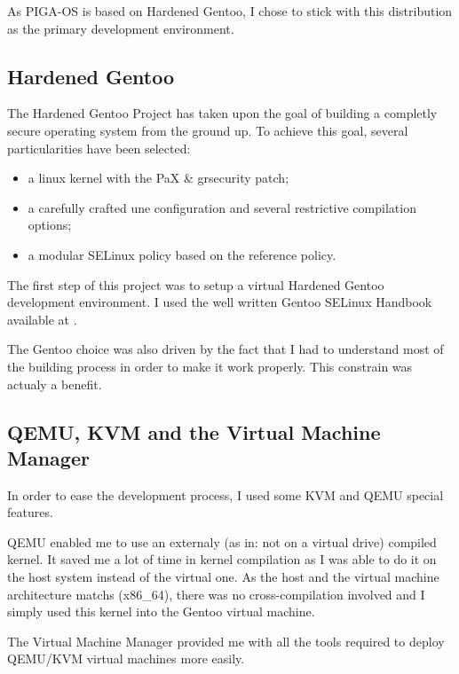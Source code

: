 \documentclass[pdftex,a4paper,titlepage,11pt]{article}
\begin{document}
\smallskip

As PIGA-OS is based on Hardened Gentoo, I chose to stick with this distribution as the primary development environment.

\subsection{Hardened Gentoo}

The Hardened Gentoo Project has taken upon the goal of building a completly secure operating system from the ground up. To achieve this goal, several particularities have been selected:
\begin{itemize}
	\item a linux kernel with the PaX \& grsecurity patch;
	\item a carefully crafted une configuration and several restrictive compilation options;
	\item a modular SELinux policy based on the reference policy.
\end{itemize}

\smallskip

The first step of this project was to setup a virtual Hardened Gentoo development environment. I used the well written Gentoo SELinux Handbook available at \cite{GSELH}.

\bigskip

The Gentoo choice was also driven by the fact that I had to understand most of the building process in order to make it work properly. This constrain was actualy a benefit.

\subsection{QEMU, KVM and the Virtual Machine Manager}

In order to ease the development process, I used some KVM and QEMU special features.

\bigskip

QEMU enabled me to use an externaly (as in: not on a virtual drive) compiled kernel. It saved me a lot of time in kernel compilation as I was able to do it on the host system instead of the virtual one. As the host and the virtual machine architecture matchs (x86\_64), there was no cross-compilation involved and I simply used this kernel into the Gentoo virtual machine.

\bigskip

The Virtual Machine Manager provided me with all the tools required to deploy QEMU/KVM virtual machines more easily.
\end{document}
